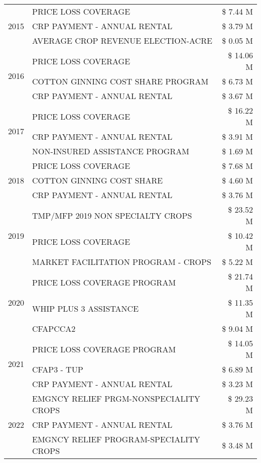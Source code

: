 \begin{tabular}{llr}
\multirow[t]{3}{*}{2015} & PRICE LOSS COVERAGE & \$ 7.44 M \\
 & CRP PAYMENT - ANNUAL RENTAL & \$ 3.79 M \\
 & AVERAGE CROP REVENUE ELECTION-ACRE & \$ 0.05 M \\
\cline{1-3}
\multirow[t]{3}{*}{2016} & PRICE LOSS COVERAGE & \$ 14.06 M \\
 & COTTON GINNING COST SHARE PROGRAM & \$ 6.73 M \\
 & CRP PAYMENT - ANNUAL RENTAL & \$ 3.67 M \\
\cline{1-3}
\multirow[t]{3}{*}{2017} & PRICE LOSS COVERAGE & \$ 16.22 M \\
 & CRP PAYMENT - ANNUAL RENTAL & \$ 3.91 M \\
 & NON-INSURED ASSISTANCE PROGRAM & \$ 1.69 M \\
\cline{1-3}
\multirow[t]{3}{*}{2018} & PRICE LOSS COVERAGE & \$ 7.68 M \\
 & COTTON GINNING COST SHARE & \$ 4.60 M \\
 & CRP PAYMENT - ANNUAL RENTAL & \$ 3.76 M \\
\cline{1-3}
\multirow[t]{3}{*}{2019} & TMP/MFP 2019 NON SPECIALTY CROPS & \$ 23.52 M \\
 & PRICE LOSS COVERAGE & \$ 10.42 M \\
 & MARKET FACILITATION PROGRAM - CROPS & \$ 5.22 M \\
\cline{1-3}
\multirow[t]{3}{*}{2020} & PRICE LOSS COVERAGE PROGRAM & \$ 21.74 M \\
 & WHIP PLUS 3 ASSISTANCE & \$ 11.35 M \\
 & CFAPCCA2 & \$ 9.04 M \\
\cline{1-3}
\multirow[t]{3}{*}{2021} & PRICE LOSS COVERAGE PROGRAM & \$ 14.05 M \\
 & CFAP3 - TUP & \$ 6.89 M \\
 & CRP PAYMENT - ANNUAL RENTAL & \$ 3.23 M \\
\cline{1-3}
\multirow[t]{3}{*}{2022} & EMGNCY RELIEF PRGM-NONSPECIALITY CROPS & \$ 29.23 M \\
 & CRP PAYMENT - ANNUAL RENTAL & \$ 3.76 M \\
 & EMGNCY RELIEF PROGRAM-SPECIALITY CROPS & \$ 3.48 M \\
\cline{1-3}
\bottomrule
\end{tabular}
